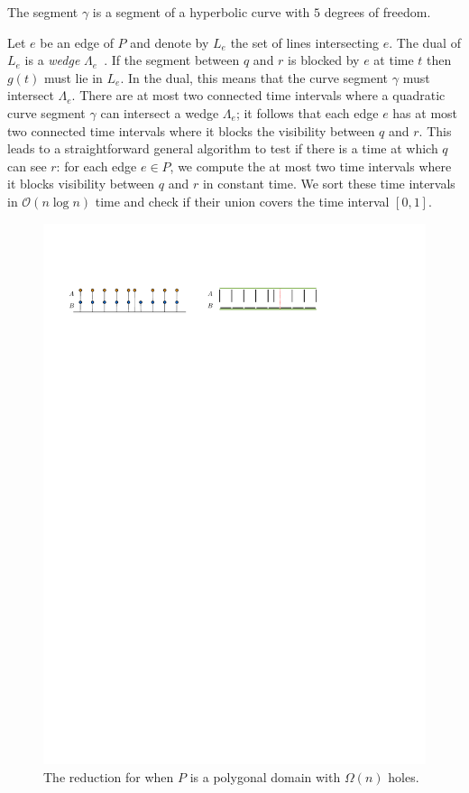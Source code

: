 \documentclass[UKenglish]{lipics-v2019}
\newcommand{\mkmcal}[1]{\ensuremath{\mathcal{#1}}\xspace}
\renewcommand{\O}{\mkmcal{O}}
\begin{document}
\begin{lemma}
  \label{lemma:hyperbola}
  The segment $\gamma$ is a segment of a hyperbolic curve with $5$ degrees of freedom.
\end{lemma}

Let $e$ be an edge of $P$ and denote by $L_e$ the set of lines intersecting $e$. 
The dual of $L_e$ is a {\em wedge} $\Lambda_e$~\cite{de1997computational}. If the segment between $q$ and $r$ is blocked by $e$ at time $t$ then $g(t)$ must lie in $L_e$. 
In the dual, this means that the curve segment $\gamma$ must intersect $\Lambda_e$.
There are at most two connected time intervals where a quadratic curve segment $\gamma$ can intersect a wedge $\Lambda_e$; it follows that each edge $e$ has at most two connected time intervals where it blocks the visibility between $q$ and $r$.
This leads to a straightforward general algorithm to test if there is a time at which $q$ can see $r$: for each edge $e \in P$, we compute the at most two time intervals where it blocks visibility between $q$ and $r$ in constant time. 
We sort these time intervals in $\O(n \log n)$ time and check if their union covers the time interval $[0,1]$.

\begin{figure}[h]
    \centering
    \includegraphics{../reduction}
    \caption{The reduction for when $P$ is a polygonal domain with $\Omega(n)$ holes.}
    \label{fig:reduction}
\end{figure}
\end{document}
